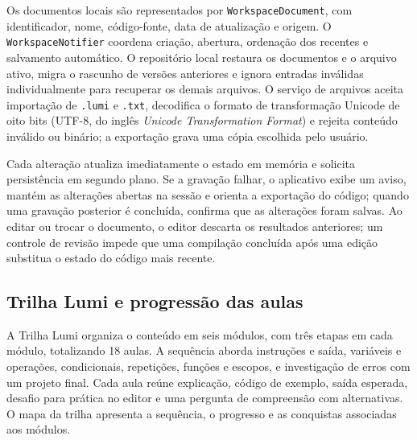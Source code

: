 \documentclass[
    12pt
    ,oneside
    ,a4paper
    ,chapter=TITLE
    ,section=TITLE
    ,sumario=abnt-6027-2012]{abntex2}
\begin{document}
Os documentos locais são representados por \texttt{WorkspaceDocument}, com identificador,
nome, código-fonte, data de atualização e origem. O \texttt{WorkspaceNotifier} coordena
criação, abertura, ordenação dos recentes e salvamento automático. O repositório local
restaura os documentos e o arquivo ativo, migra o rascunho de versões anteriores e ignora
entradas inválidas individualmente para recuperar os demais arquivos. O serviço de arquivos
aceita importação de \texttt{.lumi} e \texttt{.txt}, decodifica o formato de transformação Unicode de oito bits
(UTF-8, do inglês \textit{Unicode Transformation Format}) e rejeita conteúdo
inválido ou binário; a exportação grava uma cópia escolhida pelo usuário.

Cada alteração atualiza imediatamente o estado em memória e solicita persistência em
segundo plano. Se a gravação falhar, o aplicativo exibe um aviso, mantém as alterações
abertas na sessão e orienta a exportação do código; quando uma gravação posterior é
concluída, confirma que as alterações foram salvas. Ao editar ou trocar
o documento, o editor descarta os resultados anteriores; um controle de revisão impede que
uma compilação concluída após uma edição substitua o estado do código mais recente.

\subsection{Trilha Lumi e progressão das aulas}
\label{sec:trilha_lumi}

A Trilha Lumi organiza o conteúdo em seis módulos, com três etapas em cada módulo,
totalizando 18 aulas. A sequência aborda instruções e saída, variáveis e operações,
condicionais, repetições, funções e escopos, e investigação de erros com um projeto final.
Cada aula reúne explicação, código de exemplo, saída esperada, desafio para prática no
editor e uma pergunta de compreensão com alternativas. O mapa da trilha apresenta a
sequência, o progresso e as conquistas associadas aos módulos.
\end{document}
